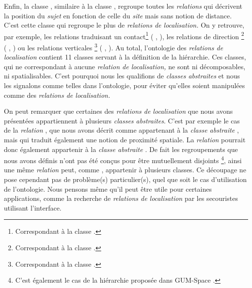 Enfin, la classe
,
similaire à la classe
, regroupe
toutes les \emph{relations} qui décrivent la position du \emph{sujet}
en fonction de celle du \emph{site} mais sans notion de
distance. C'est cette classe qui regroupe le plus de \emph{relations
  de localisation.} On y retrouve, par exemple, les relations
traduisant un contact\footnote{Correspondant à la classe
  .} (\eg
{},
), les relations de direction
\footnote{Correspondant à la classe
  .} (\eg
{}, ) ou
les relations verticales \footnote{Correspondant à la classe
  .} (\eg
{}, ). Au
total, l'ontologie des \emph{relations de localisation} contient 11
classes servant à la définition de la hiérarchie. Ces classes, qui ne
correspondant à aucune \emph{relation de localisation,} ne sont ni
décomposables, ni spatialisables. C'est pourquoi nous les qualifions
de \emph{classes abstraites} et nous les signalons comme telles dans
l'ontologie, pour éviter qu'elles soient manipulées comme des
\emph{relations de localisation.}

On peut remarquer que certaines des \emph{relations de localisation}
que nous avons présentées appartiennent à plusieurs \emph{classes
  abstraites}. C'est par exemple le cas de la \emph{relation}
, que nous avons décrit comme appartenant à la
\emph{classe abstraite}
, mais qui
traduit également une notion de proximité spatiale. La \emph{relation}
 pourrait donc également appartenir à la
\emph{classe abstraite}
. De fait les
regroupements que nous avons définis n'ont pas été conçus pour être
mutuellement disjoints \footnote{C'est également le cas de la
  hiérarchie proposée dans GUM-Space \autocite{Bateman2010}.}, ainsi
une même \emph{relation} peut, comme ,
appartenir à plusieurs classes. Ce découpage ne pose cependant pas de
problème(s) particulier(s), quel que soit le cas d'utilisation de
l'ontologie. Nous pensons même qu'il peut être utile pour certaines
applications, comme la recherche de \emph{relations de localisation}
par les secouristes utilisant l'interface.

